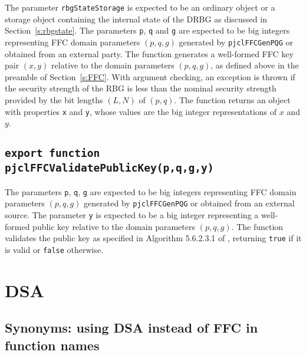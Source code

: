 \documentclass[12pt]{article}
\begin{document}
The parameter {\tt rbgStateStorage} is expected to be an ordinary
object or a storage object containing the internal state of the DRBG 
as discussed in Section~\ref{s:rbgstate}.
The parameters {\tt p}, {\tt q} and {\tt g} are expected to be big integers
representing FFC domain parameters $(p,q,g)$
generated by {\tt pjclFFCGenPQG} or obtained from an external party.
The function generates
a well-formed FFC key pair $(x,y)$ relative to the domain parameters $(p,q,g)$,
as defined above in the preamble of Section~\ref{s:FFC}.
With argument checking, an exception is thrown if the security strength
of the RBG is less than the nominal security strength provided by the
bit lengths $(L,N)$ of $(p,q)$.
The function returns an object with properties {\tt x} and {\tt y},
whose values are the big integer representations of $x$ and $y$.

\subsection{\tt export function pjclFFCValidatePublicKey(p,q,g,y)}

The parameters  {\tt p}, {\tt q}, {\tt g} are expected to be
big integers representing FFC domain parameters $(p,q,g)$
generated by {\tt pjclFFCGenPQG} or obtained from an external source.
The parameter {\tt y} is expected to be a big integer representing a 
well-formed public key relative to the domain parameters $(p,q,g)$.
The function validates the public key as specified in Algorithm 5.6.2.3.1
of \cite{NIST-DH}, returning {\tt true} if it is valid or {\tt false}
otherwise.

\section{DSA}

\subsection{Synonyms: using DSA instead of FFC in function names}
\end{document}
